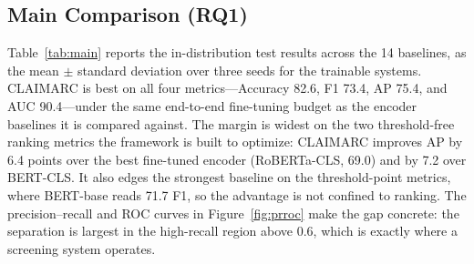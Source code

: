 \documentclass[11pt]{article}
\begin{document}
\subsection{Main Comparison (RQ1)}
\label{sec:exp:main}

Table~\ref{tab:main} reports the in-distribution test results across the 14
baselines, as the mean $\pm$ standard deviation over three seeds for the
trainable systems. CLAIMARC is best on all four metrics---Accuracy 82.6, F1
73.4, AP 75.4, and AUC 90.4---under the same end-to-end fine-tuning budget as the
encoder baselines it is compared against. The margin is widest on the two
threshold-free ranking metrics the framework is built to optimize: CLAIMARC
improves AP by 6.4 points over the best fine-tuned encoder (RoBERTa-CLS, 69.0)
and by 7.2 over BERT-CLS. It also edges the strongest baseline on the
threshold-point metrics, where BERT-base reads 71.7 F1, so the advantage is not
confined to ranking. The precision--recall and ROC curves in
Figure~\ref{fig:prroc} make the gap concrete: the separation is largest in the
high-recall region above 0.6, which is exactly where a screening system
operates.
\end{document}
